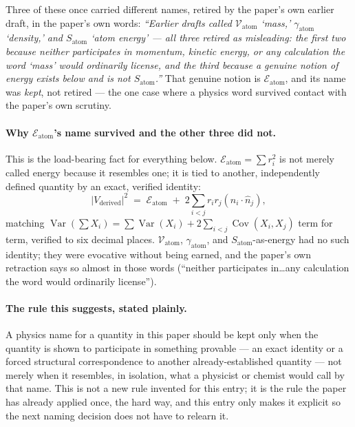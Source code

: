 \documentclass[11pt]{article}
\begin{document}
Three of these once carried different names, retired by the paper's
own earlier draft, in the paper's own words: \emph{``Earlier drafts
called $\mathcal{V}_{\text{atom}}$ `mass,' $\gamma_{\text{atom}}$
`density,' and $S_{\text{atom}}$ `atom energy' --- all three retired
as misleading: the first two because neither participates in
momentum, kinetic energy, or any calculation the word `mass' would
ordinarily license, and the third because a genuine notion of energy
exists below and is not $S_{\text{atom}}$.''} That genuine notion is
$\mathcal{E}_{\text{atom}}$, and its name was \emph{kept}, not
retired --- the one case where a physics word survived contact with
the paper's own scrutiny.

\paragraph{Why $\mathcal{E}_{\text{atom}}$'s name survived and the
other three did not.} This is the load-bearing fact for everything
below. $\mathcal{E}_{\text{atom}}=\sum r_i^2$ is not merely called
energy because it resembles one; it is tied to another, independently
defined quantity by an exact, verified identity:
\[
\lvert V_{\text{derived}}\rvert^2 \;=\; \mathcal{E}_{\text{atom}} \;+\;
2\sum_{i<j} r_ir_j(\hat n_i\cdot\hat n_j),
\]
matching $\operatorname{Var}(\sum X_i)=\sum\operatorname{Var}(X_i)+2\sum_{i<j}\operatorname{Cov}(X_i,X_j)$
term for term, verified to six decimal places. $\mathcal{V}_{\text{atom}}$,
$\gamma_{\text{atom}}$, and $S_{\text{atom}}$-as-energy had no such
identity; they were evocative without being earned, and the paper's
own retraction says so almost in those words (``neither participates
in\ldots any calculation the word would ordinarily license'').

\paragraph{The rule this suggests, stated plainly.} A physics name
for a quantity in this paper should be kept only when the quantity is
shown to participate in something provable --- an exact identity or
a forced structural correspondence to another already-established
quantity --- not merely when it resembles, in isolation, what a
physicist or chemist would call by that name. This is not a new rule
invented for this entry; it is the rule the paper has already applied
once, the hard way, and this entry only makes it explicit so the next
naming decision does not have to relearn it.
\end{document}
